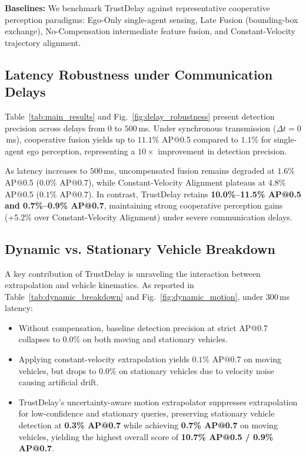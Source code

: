 \documentclass[10pt,journal,compsoc]{IEEEtran}
\begin{document}
\textbf{Baselines:} We benchmark TrustDelay against representative cooperative perception paradigms: Ego-Only single-agent sensing, Late Fusion (bounding-box exchange), No-Compensation intermediate feature fusion, and Constant-Velocity trajectory alignment.

\subsection{Latency Robustness under Communication Delays}
Table~\ref{tab:main_results} and Fig.~\ref{fig:delay_robustness} present detection precision across delays from $0$ to $500$\,ms. 
Under synchronous transmission ($\Delta t = 0$\,ms), cooperative fusion yields up to $11.1\%$ AP@0.5 compared to $1.1\%$ for single-agent ego perception, representing a $10\times$ improvement in detection precision.

As latency increases to $500$\,ms, uncompensated fusion remains degraded at $1.6\%$ AP@0.5 ($0.0\%$ AP@0.7), while Constant-Velocity Alignment plateaus at $4.8\%$ AP@0.5 ($0.1\%$ AP@0.7). In contrast, TrustDelay retains \textbf{10.0\%--11.5\% AP@0.5 and 0.7\%--0.9\% AP@0.7}, maintaining strong cooperative perception gains (+5.2\% over Constant-Velocity Alignment) under severe communication delays.

\subsection{Dynamic vs. Stationary Vehicle Breakdown}
A key contribution of TrustDelay is unraveling the interaction between extrapolation and vehicle kinematics. As reported in Table~\ref{tab:dynamic_breakdown} and Fig.~\ref{fig:dynamic_motion}, under $300$\,ms latency:
\begin{itemize}
    \item Without compensation, baseline detection precision at strict AP@0.7 collapses to $0.0\%$ on both moving and stationary vehicles.
    \item Applying constant-velocity extrapolation yields $0.1\%$ AP@0.7 on moving vehicles, but drops to $0.0\%$ on stationary vehicles due to velocity noise causing artificial drift.
    \item TrustDelay's uncertainty-aware motion extrapolator suppresses extrapolation for low-confidence and stationary queries, preserving stationary vehicle detection at \textbf{0.3\% AP@0.7} while achieving \textbf{0.7\% AP@0.7} on moving vehicles, yielding the highest overall score of \textbf{10.7\% AP@0.5 / 0.9\% AP@0.7}.
\end{itemize}
\end{document}
